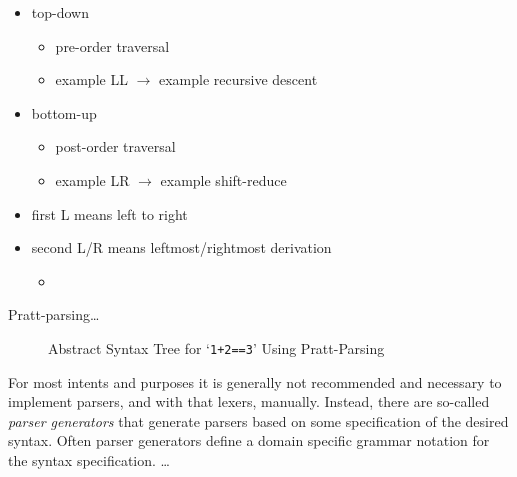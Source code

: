 
\begin{itemize}
    \item top-down
    \begin{itemize}
        \item pre-order traversal
        \item example LL $\rightarrow$ example recursive descent
    \end{itemize}
    \item bottom-up
    \begin{itemize}
        \item post-order traversal
        \item example LR $\rightarrow$ example shift-reduce
    \end{itemize}
    \item first L means left to right
    \item second L/R means leftmost/rightmost derivation
    \begin{itemize}
        \item {}
    \end{itemize}
\end{itemize}

Pratt-parsing\ldots
{}

\begin{wrapfigure}{R}{0.5\textwidth}
    \centering
    \caption{Abstract Syntax Tree for `\texttt{1+2==3}' Using Pratt-Parsing}\label{fig:parser_simple_ast_pratt}
\end{wrapfigure}

For most intents and purposes it is generally not recommended and necessary to implement parsers, and with that lexers, manually.
Instead, there are so-called \emph{parser generators} that generate parsers based on some specification of the desired syntax.
Often parser generators define a domain specific grammar notation for the syntax specification.
\ldots
